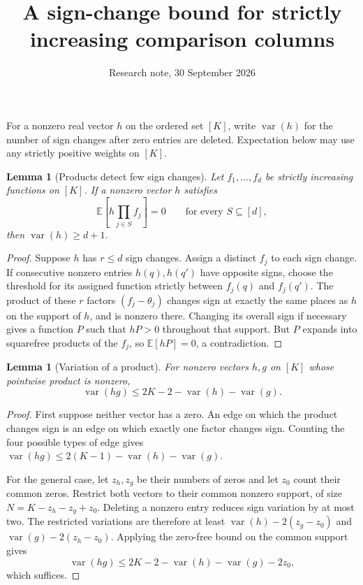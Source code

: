 \documentclass[11pt]{article}
\title{A sign-change bound for strictly increasing comparison columns}
\author{Research note, 30 September 2026}
\date{}
\newtheorem{lemma}[theorem]{Lemma}
\newcommand{\E}{\mathbb E}
\newcommand{\V}{\operatorname{var}}
\begin{document}
\maketitle

For a nonzero real vector $h$ on the ordered set $[K]$, write $\V(h)$
for the number of sign changes after zero entries are deleted.
Expectation below may use any strictly positive weights on $[K]$.

\begin{lemma}[Products detect few sign changes]\label{variation}
Let $f_1,\ldots,f_d$ be strictly increasing functions on $[K]$.
If a nonzero vector $h$ satisfies
\[
 \E\left[h\prod_{j\in S}f_j\right]=0
 \qquad\text{for every }S\subseteq[d],
\]
then $\V(h)\ge d+1$.
\end{lemma}
\begin{proof}
Suppose $h$ has $r\le d$ sign changes. Assign a distinct $f_j$ to
each sign change. If consecutive nonzero entries $h(q),h(q')$ have
opposite signs, choose the threshold for its assigned function strictly
between $f_j(q)$ and $f_j(q')$. The product of these $r$ factors
$(f_j-\theta_j)$ changes sign at exactly the same places as $h$ on
the support of $h$, and is nonzero there. Changing its overall sign
if necessary gives a function $P$ such that $hP>0$ throughout that
support. But $P$ expands into squarefree products of the $f_j$, so
$\E[hP]=0$, a contradiction.
\end{proof}

\begin{lemma}[Variation of a product]\label{product}
For nonzero vectors $h,g$ on $[K]$ whose pointwise product is nonzero,
\[
 \V(hg)\le 2K-2-\V(h)-\V(g).
\]
\end{lemma}
\begin{proof}
First suppose neither vector has a zero. An edge on which the product
changes sign is an edge on which exactly one factor changes sign.
Counting the four possible types of edge gives
$\V(hg)\le2(K-1)-\V(h)-\V(g)$.

For the general case, let $z_h,z_g$ be their numbers of zeros and let
$z_0$ count their common zeros. Restrict both vectors to their common
nonzero support, of size $N=K-z_h-z_g+z_0$.
Deleting a nonzero entry reduces sign variation by at most two.
The restricted variations are therefore at least
$\V(h)-2(z_g-z_0)$ and $\V(g)-2(z_h-z_0)$.
Applying the zero-free bound on the common support gives
\[
 \V(hg)\le2K-2-\V(h)-\V(g)-2z_0,
\]
which suffices.
\end{proof}
\end{document}
